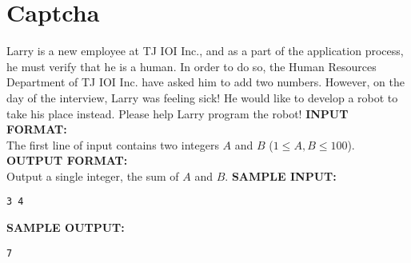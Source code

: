 \section{Captcha}

Larry is a new employee at TJ IOI Inc., and as a part of the application process, he must verify that he is a human.  In order to do so, the Human Resources Department of TJ IOI Inc. have asked him to add two numbers.  However, on the day of the interview, Larry was feeling sick!  He would like to develop a robot to take his place instead.  Please help Larry program the robot!
\blank
\textbf{INPUT FORMAT:}\\
The first line of input contains two integers $A$ and $B$ ($ 1 \leq A,B \leq 100 $).
\blank
\textbf{OUTPUT FORMAT:}\\
Output a single integer, the sum of $A$ and $B$.
\blank
\textbf{SAMPLE INPUT:}
\begin{verbatim}
3 4
\end{verbatim}
\textbf{SAMPLE OUTPUT:}
\begin{verbatim}
7
\end{verbatim}

